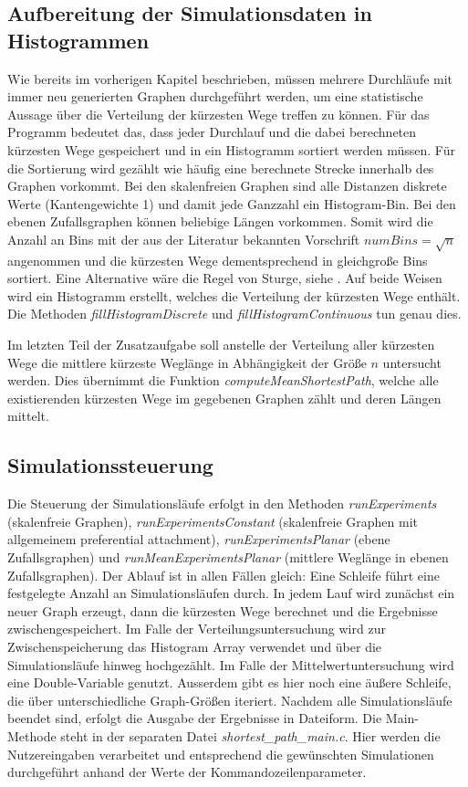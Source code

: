 \documentclass[10pt]{article}
\begin{document}
\subsection{Aufbereitung der Simulationsdaten in Histogrammen}
Wie bereits im vorherigen Kapitel beschrieben, müssen mehrere Durchläufe mit immer neu generierten Graphen durchgeführt werden, um eine statistische Aussage über die Verteilung der kürzesten Wege treffen zu können. Für das Programm bedeutet das, dass jeder Durchlauf und die dabei berechneten kürzesten Wege gespeichert und in ein Histogramm sortiert werden müssen. Für die Sortierung wird gezählt wie häufig eine berechnete Strecke innerhalb des Graphen vorkommt. Bei den skalenfreien Graphen sind alle Distanzen diskrete Werte (Kantengewichte 1) und damit jede Ganzzahl ein Histogram-Bin. Bei den ebenen Zufallsgraphen können beliebige Längen vorkommen. Somit wird die Anzahl an Bins mit der aus der Literatur bekannten Vorschrift $numBins=\sqrt{n}$ angenommen und die kürzesten Wege dementsprechend in gleichgroße Bins sortiert. Eine Alternative wäre die Regel von Sturge, siehe \cite{Sturge}.
Auf beide Weisen wird ein Histogramm erstellt, welches die Verteilung der kürzesten Wege enthält. Die Methoden \textit{fillHistogramDiscrete} und \textit{fillHistogramContinuous} tun genau dies.

Im letzten Teil der Zusatzaufgabe soll anstelle der Verteilung aller kürzesten Wege die mittlere kürzeste Weglänge in Abhängigkeit der Größe $n$ untersucht werden. Dies übernimmt die Funktion \textit{computeMeanShortestPath}, welche alle existierenden kürzesten Wege im gegebenen Graphen zählt und deren Längen mittelt.

\subsection{Simulationssteuerung}
Die Steuerung der Simulationsläufe erfolgt in den Methoden \textit{runExperiments} (skalenfreie Graphen), \textit{runExperimentsConstant} (skalenfreie Graphen mit allgemeinem preferential attachment), \textit{runExperimentsPlanar} (ebene Zufallsgraphen) und \textit{runMeanExperimentsPlanar} (mittlere Weglänge in ebenen Zufallsgraphen). Der Ablauf ist in allen Fällen gleich: Eine Schleife führt eine festgelegte Anzahl an Simulationsläufen durch. In jedem Lauf wird zunächst ein neuer Graph erzeugt, dann die kürzesten Wege berechnet und die Ergebnisse zwischengespeichert. Im Falle der Verteilungsuntersuchung wird zur Zwischenspeicherung das Histogram Array verwendet und über die Simulationsläufe hinweg hochgezählt. Im Falle der Mittelwertuntersuchung wird eine Double-Variable genutzt. Ausserdem gibt es hier noch eine äußere Schleife, die über unterschiedliche Graph-Größen iteriert. Nachdem alle Simulationsläufe beendet sind, erfolgt die Ausgabe der Ergebnisse in Dateiform. Die Main-Methode steht in der separaten Datei \textit{shortest\_path\_main.c}. Hier werden die Nutzereingaben verarbeitet und entsprechend die gewünschten Simulationen durchgeführt anhand der Werte der Kommandozeilenparameter.
\end{document}
